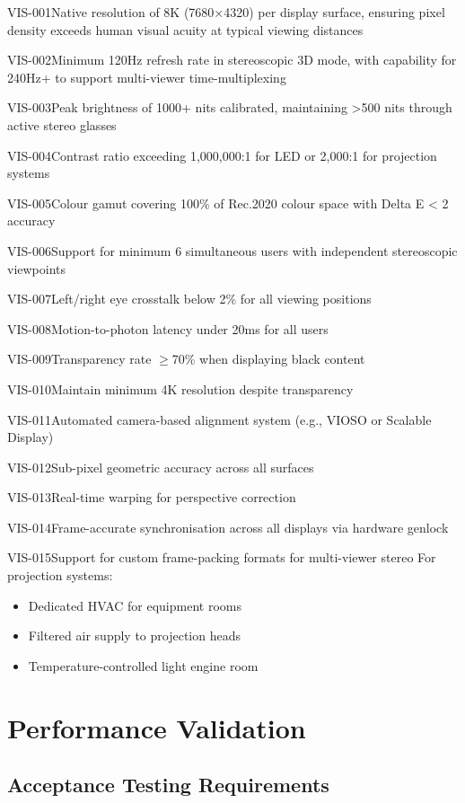 \begin{requirement}{VIS-001}{Native resolution of 8K (7680×4320) per display surface, ensuring pixel density exceeds human visual acuity at typical viewing distances}
\begin{requirement}{VIS-002}{Minimum 120Hz refresh rate in stereoscopic 3D mode, with capability for 240Hz+ to support multi-viewer time-multiplexing}
\begin{requirement}{VIS-003}{Peak brightness of 1000+ nits calibrated, maintaining >500 nits through active stereo glasses}
\begin{requirement}{VIS-004}{Contrast ratio exceeding 1,000,000:1 for LED or 2,000:1 for projection systems}
\begin{requirement}{VIS-005}{Colour gamut covering 100\% of Rec.2020 colour space with Delta E < 2 accuracy}
\begin{requirement}{VIS-006}{Support for minimum 6 simultaneous users with independent stereoscopic viewpoints}
\begin{requirement}{VIS-007}{Left/right eye crosstalk below 2\% for all viewing positions}
\begin{requirement}{VIS-008}{Motion-to-photon latency under 20ms for all users}
\begin{requirement}{VIS-009}{Transparency rate $\ge$70\% when displaying black content}
\begin{requirement}{VIS-010}{Maintain minimum 4K resolution despite transparency}
\begin{requirement}{VIS-011}{Automated camera-based alignment system (e.g., VIOSO or Scalable Display)}
\begin{requirement}{VIS-012}{Sub-pixel geometric accuracy across all surfaces}
\begin{requirement}{VIS-013}{Real-time warping for perspective correction}
\begin{requirement}{VIS-014}{Frame-accurate synchronisation across all displays via hardware genlock}
\begin{requirement}{VIS-015}{Support for custom frame-packing formats for multi-viewer stereo}
For projection systems:
\begin{itemize}
    \item Dedicated HVAC for equipment rooms
    \item Filtered air supply to projection heads
    \item Temperature-controlled light engine room
\end{itemize}

\section{Performance Validation}

\subsection{Acceptance Testing Requirements}


\end{requirement}
\end{requirement}
\end{requirement}
\end{requirement}
\end{requirement}
\end{requirement}
\end{requirement}
\end{requirement}
\end{requirement}
\end{requirement}
\end{requirement}
\end{requirement}
\end{requirement}
\end{requirement}
\end{requirement}
